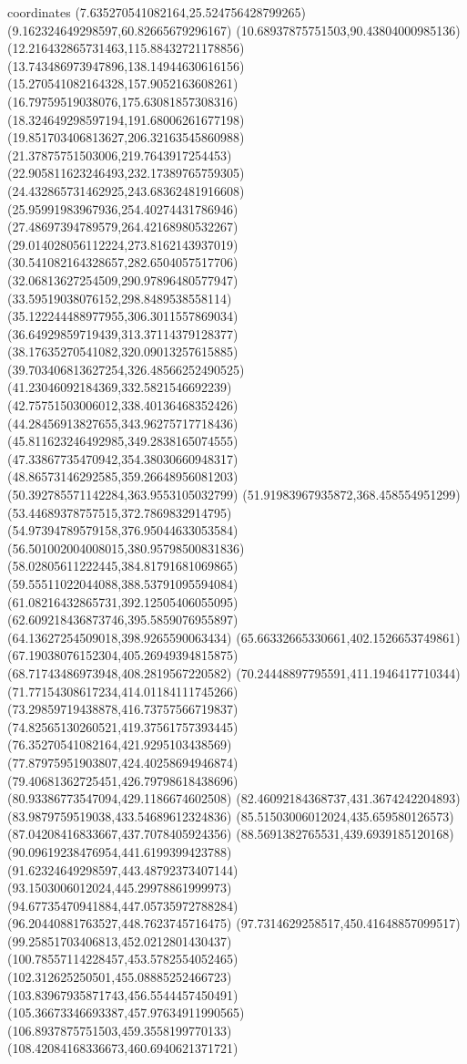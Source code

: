 coordinates {%
(7.635270541082164,25.524756428799265)
(9.162324649298597,60.82665679296167)
(10.68937875751503,90.43804000985136)
(12.216432865731463,115.88432721178856)
(13.743486973947896,138.14944630616156)
(15.270541082164328,157.9052163608261)
(16.79759519038076,175.63081857308316)
(18.324649298597194,191.68006261677198)
(19.851703406813627,206.32163545860988)
(21.37875751503006,219.7643917254453)
(22.905811623246493,232.17389765759305)
(24.432865731462925,243.68362481916608)
(25.95991983967936,254.40274431786946)
(27.48697394789579,264.42168980532267)
(29.014028056112224,273.8162143937019)
(30.541082164328657,282.6504057517706)
(32.06813627254509,290.97896480577947)
(33.59519038076152,298.8489538558114)
(35.122244488977955,306.3011557869034)
(36.64929859719439,313.37114379128377)
(38.17635270541082,320.09013257615885)
(39.703406813627254,326.48566252490525)
(41.23046092184369,332.5821546692239)
(42.75751503006012,338.40136468352426)
(44.28456913827655,343.96275717718436)
(45.811623246492985,349.2838165074555)
(47.33867735470942,354.38030660948317)
(48.86573146292585,359.26648956081203)
(50.392785571142284,363.9553105032799)
(51.91983967935872,368.458554951299)
(53.44689378757515,372.7869832914795)
(54.97394789579158,376.95044633053584)
(56.501002004008015,380.95798500831836)
(58.02805611222445,384.81791681069865)
(59.55511022044088,388.53791095594084)
(61.08216432865731,392.12505406055095)
(62.609218436873746,395.5859076955897)
(64.13627254509018,398.9265590063434)
(65.66332665330661,402.1526653749861)
(67.19038076152304,405.26949394815875)
(68.71743486973948,408.2819567220582)
(70.24448897795591,411.1946417710344)
(71.77154308617234,414.01184111745266)
(73.29859719438878,416.73757566719837)
(74.82565130260521,419.37561757393445)
(76.35270541082164,421.9295103438569)
(77.87975951903807,424.40258694946874)
(79.40681362725451,426.79798618438696)
(80.93386773547094,429.1186674602508)
(82.46092184368737,431.3674242204893)
(83.9879759519038,433.54689612324836)
(85.51503006012024,435.659580126573)
(87.04208416833667,437.7078405924356)
(88.5691382765531,439.6939185120168)
(90.09619238476954,441.6199399423788)
(91.62324649298597,443.48792373407144)
(93.1503006012024,445.29978861999973)
(94.67735470941884,447.05735972788284)
(96.20440881763527,448.7623745716475)
(97.7314629258517,450.41648857099517)
(99.25851703406813,452.0212801430437)
(100.78557114228457,453.5782554052465)
(102.312625250501,455.08885252466723)
(103.83967935871743,456.5544457450491)
(105.36673346693387,457.97634911990565)
(106.8937875751503,459.3558199770133)
(108.42084168336673,460.6940621371721)
}
